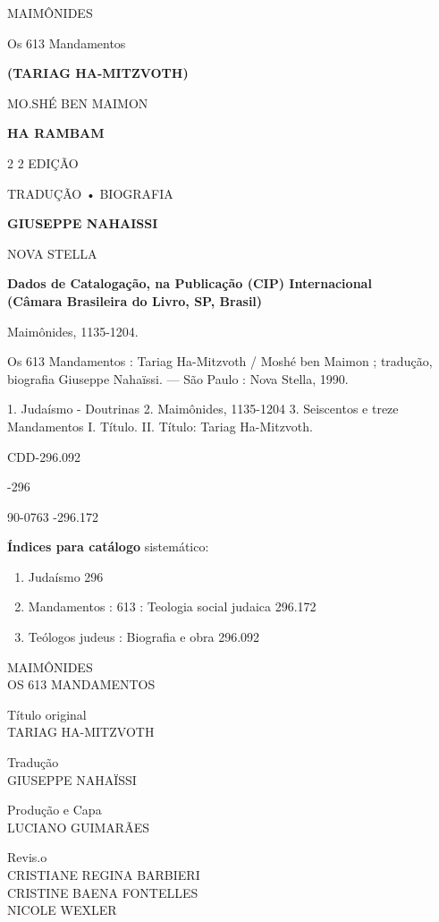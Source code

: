 MAIMÔNIDES

Os 613 Mandamentos


\textbf{(TARIAG HA-MITZVOTH)}

MO.SHÉ BEN MAIMON

\textbf{HA RAMBAM}


2 2 EDIÇÃO

TRADUÇÃO • BIOGRAFIA


\textbf{GIUSEPPE NAHAISSI}

NOVA STELLA

\textbf{Dados de Catalogação, na Publicação (CIP) Internacional\\
(Câmara Brasileira do Livro, SP, Brasil)}


Maimônides, 1135-1204.

Os 613 Mandamentos : Tariag Ha-Mitzvoth / Moshé ben Maimon ; tradução,
biografia Giuseppe Nahaïssi. --- São Paulo : Nova Stella, 1990.

1. Judaísmo - Doutrinas 2. Maimônides, 1135-1204 3. Seiscentos e treze
Mandamentos I. Título. II. Título: Tariag Ha-Mitzvoth.


CDD-296.092

-296

90-0763 -296.172


\textbf{Índices para catálogo} sistemático:


\begin{enumerate}
\def\labelenumi{\arabic{enumi}.}
\item
 
 Judaísmo 296
 
\item
 
 Mandamentos : 613 : Teologia social judaica 296.172
 
\item
 
 Teólogos judeus : Biografia e obra 296.092
 
\end{enumerate}

MAIMÔNIDES\\
OS 613 MANDAMENTOS

Título original\\
TARIAG HA-MITZVOTH

Tradução\\
GIUSEPPE NAHAÏSSI

Produção e Capa\\
LUCIANO GUIMARÃES

Revis.o\\
CRISTIANE REGINA BARBIERI\\
CRISTINE BAENA FONTELLES\\
NICOLE WEXLER

